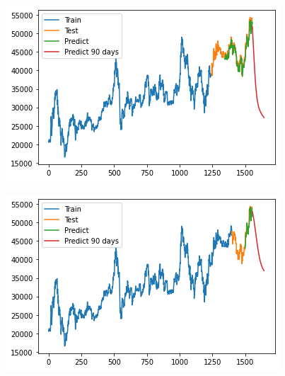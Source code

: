 \documentclass[conference]{IEEEtran}
\begin{document}
\begin{minipage}{0.23\textwidth}
    \centering
    \includegraphics[width=\linewidth]{images/GRU/GRU_BIDV_90days_82.png}
    \label{fig:image1}
\end{minipage}
\hfill
\begin{minipage}{0.23\textwidth}
    \centering
    \includegraphics[width=\linewidth]{images/GRU/GRU_BIDV_90days_91.png}
    \label{fig:image2}
\end{minipage}
\end{document}
